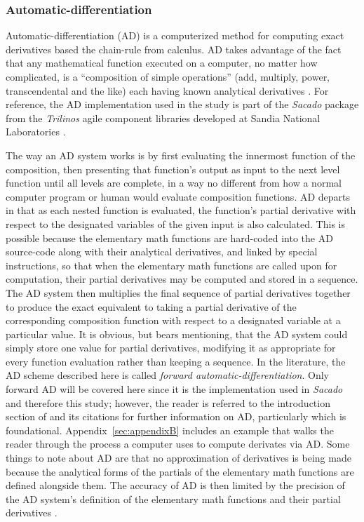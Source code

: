 \documentclass[preprint,12pt]{elsarticle}
\begin{document}
\subsubsection{Automatic-differentiation} 
\label{ADsubsection}

Automatic-differentiation (AD) is a computerized method for computing exact derivatives based the chain-rule from calculus. AD takes advantage of the fact that any mathematical function executed on a computer, no matter how complicated, is a ``composition of simple operations'' (add, multiply, power, transcendental and the like) each having known analytical derivatives \cite{ref-sacado-presentation}. For reference, the AD implementation used in the study is part of the \emph{Sacado} package from the \emph{Trilinos} agile component libraries developed at Sandia National Laboratories \cite{ref-Sacado}.

The way an AD system works is by first evaluating the innermost function of the composition, then presenting that function's output as input to the next level function until all levels are complete, in a way no different from how a normal computer program or human would evaluate composition functions.  AD departs in that as each nested function is evaluated, the function's partial derivative with respect to the designated variables of the given input is also calculated.  This is possible because the elementary math functions are hard-coded into the AD source-code along with their analytical derivatives, and linked by special instructions, so that when the elementary math functions are called upon for computation, their partial derivatives may be computed and stored in a sequence. The AD system then multiplies the final sequence of partial derivatives together to produce the exact equivalent to taking a partial derivative of the corresponding composition function with respect to a designated variable at a particular value. It is obvious, but bears mentioning, that the AD system could simply store one value for partial derivatives, modifying it as appropriate for every function evaluation rather than keeping a sequence.  In the literature, the AD scheme described here is called \emph{forward automatic-differentiation}. Only forward AD will be covered here since it is the implementation used in \emph{Sacado} and therefore this study; however, the reader is referred to the introduction section of \cite{ref-AD-methods} and its citations for further information on AD, particularly \cite{ref-on-AD} which is foundational. Appendix~\ref{sec:appendixB} includes an example that walks the reader through the process a computer uses to compute derivates via AD.  Some things to note about AD are that no approximation of derivatives is being made because the analytical forms of the partials of the elementary math functions are defined alongside them. The accuracy of AD is then limited by the precision of the AD system's definition of the elementary math functions and their partial derivatives .
 
\end{document}
